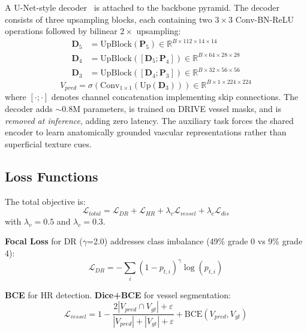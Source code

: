 \documentclass[conference]{IEEEtran}
\begin{document}
A U-Net-style decoder~\cite{ronneberger2015} is attached to the backbone pyramid. The decoder consists of three upsampling blocks, each containing two $3\times3$ Conv-BN-ReLU operations followed by bilinear $2\times$ upsampling:
\begin{align}
\mathbf{D}_5 &= \text{UpBlock}(\mathbf{P}_5) \in \mathbb{R}^{B \times 112 \times 14 \times 14} \\
\mathbf{D}_4 &= \text{UpBlock}([\mathbf{D}_5; \mathbf{P}_4]) \in \mathbb{R}^{B \times 64 \times 28 \times 28} \\
\mathbf{D}_3 &= \text{UpBlock}([\mathbf{D}_4; \mathbf{P}_3]) \in \mathbb{R}^{B \times 32 \times 56 \times 56}
\end{align}
\begin{equation}
V_{pred} = \sigma(\text{Conv}_{1\times1}(\text{Up}(\mathbf{D}_3))) \in \mathbb{R}^{B \times 1 \times 224 \times 224}
\end{equation}
where $[\cdot;\cdot]$ denotes channel concatenation implementing skip connections. The decoder adds $\sim$0.8M parameters, is trained on DRIVE vessel masks, and is \textit{removed at inference}, adding zero latency. The auxiliary task forces the shared encoder to learn anatomically grounded vascular representations rather than superficial texture cues.

\subsection{Loss Functions}

The total objective is:
\begin{equation}
\mathcal{L}_{total} = \mathcal{L}_{DR} + \mathcal{L}_{HR} + \lambda_v \mathcal{L}_{vessel} + \lambda_c \mathcal{L}_{dis}
\end{equation}
with $\lambda_v = 0.5$ and $\lambda_c = 0.3$.

\textbf{Focal Loss} for DR ($\gamma$=2.0) addresses class imbalance (49\% grade 0 vs 9\% grade 4):
\begin{equation}
\mathcal{L}_{DR} = -\sum_{i}(1-p_{t,i})^{\gamma}\log(p_{t,i})
\end{equation}

\textbf{BCE} for HR detection. \textbf{Dice+BCE} for vessel segmentation:
\begin{equation}
\mathcal{L}_{vessel} = 1 - \frac{2|V_{pred} \cap V_{gt}| + \varepsilon}{|V_{pred}| + |V_{gt}| + \varepsilon} + \text{BCE}(V_{pred}, V_{gt})
\end{equation}
\end{document}
